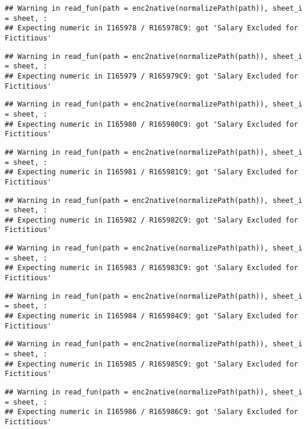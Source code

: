 \documentclass[
]{article}
\begin{document}
\begin{verbatim}
## Warning in read_fun(path = enc2native(normalizePath(path)), sheet_i = sheet, :
## Expecting numeric in I165978 / R165978C9: got 'Salary Excluded for Fictitious'
\end{verbatim}

\begin{verbatim}
## Warning in read_fun(path = enc2native(normalizePath(path)), sheet_i = sheet, :
## Expecting numeric in I165979 / R165979C9: got 'Salary Excluded for Fictitious'
\end{verbatim}

\begin{verbatim}
## Warning in read_fun(path = enc2native(normalizePath(path)), sheet_i = sheet, :
## Expecting numeric in I165980 / R165980C9: got 'Salary Excluded for Fictitious'
\end{verbatim}

\begin{verbatim}
## Warning in read_fun(path = enc2native(normalizePath(path)), sheet_i = sheet, :
## Expecting numeric in I165981 / R165981C9: got 'Salary Excluded for Fictitious'
\end{verbatim}

\begin{verbatim}
## Warning in read_fun(path = enc2native(normalizePath(path)), sheet_i = sheet, :
## Expecting numeric in I165982 / R165982C9: got 'Salary Excluded for Fictitious'
\end{verbatim}

\begin{verbatim}
## Warning in read_fun(path = enc2native(normalizePath(path)), sheet_i = sheet, :
## Expecting numeric in I165983 / R165983C9: got 'Salary Excluded for Fictitious'
\end{verbatim}

\begin{verbatim}
## Warning in read_fun(path = enc2native(normalizePath(path)), sheet_i = sheet, :
## Expecting numeric in I165984 / R165984C9: got 'Salary Excluded for Fictitious'
\end{verbatim}

\begin{verbatim}
## Warning in read_fun(path = enc2native(normalizePath(path)), sheet_i = sheet, :
## Expecting numeric in I165985 / R165985C9: got 'Salary Excluded for Fictitious'
\end{verbatim}

\begin{verbatim}
## Warning in read_fun(path = enc2native(normalizePath(path)), sheet_i = sheet, :
## Expecting numeric in I165986 / R165986C9: got 'Salary Excluded for Fictitious'
\end{verbatim}
\end{document}
